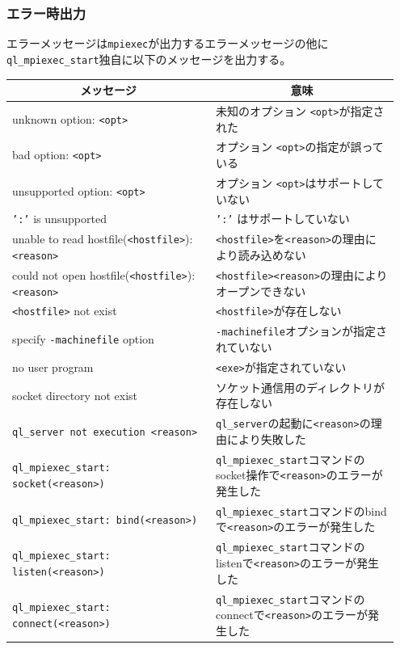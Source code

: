 \documentclass[twoside,11pt,fleqn]{book}
\begin{document}
\subsubsection*{エラー時出力}{\quad}
エラーメッセージは\texttt{mpiexec}が出力するエラーメッセージの他に\texttt{ql\_mpiexec\_start}独自に以下のメッセージを出力する。
\begin{table}[!h]
\footnotesize
\begin{tabular}{|p{0.50\linewidth}|p{0.45\linewidth}|} \hline
\multicolumn{1}{|c}{\textbf{メッセージ}}&\multicolumn{1}{|c|}{\textbf{意味}}\\ \hline \hline
unknown option: \texttt{<opt>} &未知のオプション \texttt{<opt>}が指定された\\ \hline
bad option: \texttt{<opt>} &オプション \texttt{<opt>}の指定が誤っている\\ \hline
unsupported option: \texttt{<opt>} &オプション \texttt{<opt>}はサポートしていない\\ \hline
\texttt{':'} is unsupported&\texttt{':'} はサポートしていない\\ \hline
unable to read hostfile(\texttt{<hostfile>}): \texttt{<reason>}&\texttt{<hostfile>}を\texttt{<reason>}の理由により読み込めない\\ \hline
could not open hostfile(\texttt{<hostfile>}): \texttt{<reason>}&\texttt{<hostfile>}\texttt{<reason>}の理由によりオープンできない\\ \hline
\texttt{<hostfile>} not exist&\texttt{<hostfile>}が存在しない\\ \hline
specify \texttt{-machinefile} option&\texttt{-machinefile}オプションが指定されていない\\ \hline
no user program&\texttt{<exe>}が指定されていない\\ \hline
socket directory not exist&ソケット通信用のディレクトリが存在しない\\ \hline
\texttt{ql\_server not execution <reason>}&\texttt{ql\_server}の起動に\texttt{<reason>}の理由により失敗した\\ \hline
\texttt{ql\_mpiexec\_start: socket(<reason>)}&\texttt{ql\_mpiexec\_start}コマンドのsocket操作で\texttt{<reason>}のエラーが発生した\\ \hline
\texttt{ql\_mpiexec\_start: bind(<reason>)}&\texttt{ql\_mpiexec\_start}コマンドのbindで\texttt{<reason>}のエラーが発生した\\ \hline
\texttt{ql\_mpiexec\_start: listen(<reason>)}　&\texttt{ql\_mpiexec\_start}コマンドのlistenで\texttt{<reason>}のエラーが発生した\\ \hline
\texttt{ql\_mpiexec\_start: connect(<reason>)}　&\texttt{ql\_mpiexec\_start}コマンドのconnectで\texttt{<reason>}のエラーが発生した\\ \hline
\end{tabular}
\vspace{-0em}
\end{table}
\FloatBarrier
\end{document}
